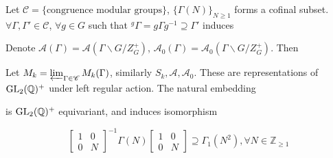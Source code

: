 \documentclass[main]{subfiles}
\begin{document}
Let $\mathscr C=\{\text{congruence modular groups}\}$, $\{\Gamma(N)\}_{N\geq1}$ forms a cofinal subset. $\forall\Gamma,\Gamma'\in\mathscr C$, $\forall g\in G$ such that $^g\Gamma=g\Gamma g^{-1}\supseteq\Gamma'$ induces
\begin{center}
\end{center}
Denote $\mathcal A(\Gamma)=\mathcal A(\Gamma\backslash G/Z_G^+)$, $\mathcal A_0(\Gamma)=\mathcal A_0(\Gamma\backslash G/Z_G^+)$. Then
\begin{center}
\end{center}
Let $M_k=\varprojlim_{\Gamma\in\mathscr C}M_k(\Gamma)$, similarly $S_k,\mathcal A,\mathcal A_0$. These are representations of $\operatorname{GL}_2(\mathbb Q)^+$ under left regular action. The natural embedding
\begin{center}
\end{center}
is $\operatorname{GL}_2(\mathbb Q)^+$ equivariant, and induces isomorphism
\begin{center}
\end{center}

\begin{note}
\[\begin{bmatrix}
1&0\\
0&N
\end{bmatrix}^{-1}\Gamma(N)\begin{bmatrix}
1&0\\
0&N
\end{bmatrix}\supseteq\Gamma_1(N^2),\forall N\in\mathbb Z_{\geq1}\]
\end{note}
\end{document}
